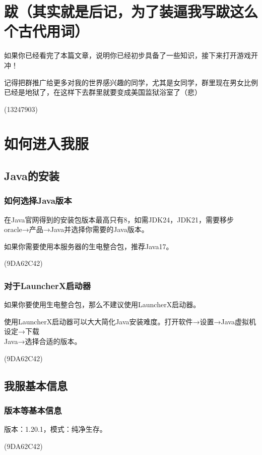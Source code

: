 \documentclass[UTF8,a4paper]{article}
\begin{document}
	\section{跋（其实就是后记，为了装逼我写跋这么个古代用词）}
			\par 如果你已经看完了本篇文章，说明你已经初步具备了一些知识，接下来打开游戏开冲！
			\par 记得把群推广给更多对我的世界感兴趣的同学，尤其是女同学，群里现在男女比例已经是地狱了，在这样下去群里就要变成美国监狱浴室了（悲）
			\begin{flushright}(13247903)\end{flushright}


	\section{如何进入我服}
		\hypertarget{howtologinin}{}
		\subsection{Java的安装}
			\subsubsection{如何选择Java版本}
				\par 在Java官网得到的安装包版本最高只有8，如需JDK24，JDK21，需要移步oracle→产品→Java并选择你需要的Java版本。
				\par 如果你需要使用本服务器的生电整合包，推荐Java17。
				\begin{flushright}(9DA62C42)\end{flushright}
			\subsubsection{对于LauncherX启动器}
				\par 如果你要使用生电整合包，那么不建议使用LauncherX启动器。
				\par 使用LauncherX启动器可以大大简化Java安装难度。打开软件→设置→Java虚拟机设定→下载 \\ Java→选择合适的版本。
				\begin{flushright}(9DA62C42)\end{flushright}
		\subsection{我服基本信息}
			\subsubsection{版本等基本信息}
				\par 版本：1.20.1，模式：纯净生存。
				\begin{flushright}(9DA62C42)\end{flushright}
\end{document}
